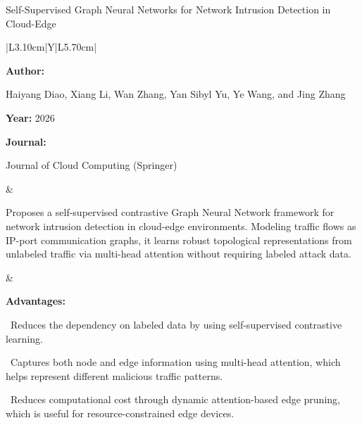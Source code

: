 \begin{frame}[t]{Self-Supervised Graph Neural Networks for Network Intrusion Detection in Cloud-Edge}
\vspace{-0.30em}
{\footnotesize\setlength{\tabcolsep}{3.5pt}\renewcommand{\arraystretch}{1.10}
\begin{tabularx}{\textwidth}{|L{3.10cm}|Y|L{5.70cm}|}
\hline\lrhdr\hline
\begin{minipage}[t]{\linewidth}\fontsize{7.2pt}{9.2pt}\raggedright\selectfont
\textbf{Author:}\par
Haiyang Diao, Xiang Li, Wan Zhang, Yan Sibyl Yu, Ye Wang, and Jing Zhang\par\vspace{4pt}
\textbf{Year:} 2026\par\vspace{4pt}
\textbf{Journal:}\par
Journal of Cloud Computing (Springer)\par\vspace{4pt}
\end{minipage}
&
\begin{minipage}[t]{\linewidth}\fontsize{7.2pt}{9.2pt}\raggedright\selectfont
Proposes a self-supervised contrastive Graph Neural Network framework for network intrusion detection in cloud-edge environments. Modeling traffic flows as IP-port communication graphs, it learns robust topological representations from unlabeled traffic via multi-head attention without requiring labeled attack data.\par\vspace{4pt}
\end{minipage}
&
\begin{minipage}[t]{\linewidth}\fontsize{6.6pt}{8.1pt}\raggedright\selectfont
\textcolor{strengthGreen}{\textbf{Advantages:}}\par\vspace{1.3pt}
\textbullet~Reduces the dependency on labeled data by using self-supervised contrastive learning.\par\vspace{1.8pt}\textbullet~Captures both node and edge information using multi-head attention, which helps represent different malicious traffic patterns.\par\vspace{1.8pt}\textbullet~Reduces computational cost through dynamic attention-based edge pruning, which is useful for resource-constrained edge devices.\par\vspace{3.2pt}

\end{minipage}
\end{tabularx}}
\end{frame}
